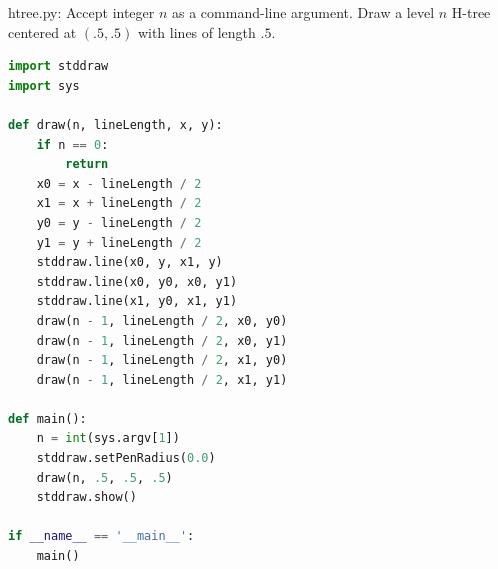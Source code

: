 \documentclass[8pt,a4paper,compress]{beamer}
\begin{document}
\begin{frame}[fragile]
\begin{framed}
\tiny htree.py: Accept integer $n$ as a command-line argument. Draw a level $n$ H-tree centered at $(.5, .5)$ with lines of length $.5$.
\end{framed}

\begin{lstlisting}[language=Python]
import stddraw
import sys

def draw(n, lineLength, x, y):
    if n == 0:
        return
    x0 = x - lineLength / 2
    x1 = x + lineLength / 2
    y0 = y - lineLength / 2
    y1 = y + lineLength / 2
    stddraw.line(x0, y, x1, y)
    stddraw.line(x0, y0, x0, y1)
    stddraw.line(x1, y0, x1, y1)
    draw(n - 1, lineLength / 2, x0, y0)
    draw(n - 1, lineLength / 2, x0, y1)
    draw(n - 1, lineLength / 2, x1, y0)
    draw(n - 1, lineLength / 2, x1, y1)

def main():
    n = int(sys.argv[1])
    stddraw.setPenRadius(0.0)
    draw(n, .5, .5, .5)
    stddraw.show()

if __name__ == '__main__':
    main()
\end{lstlisting}
\end{frame}
\end{document}
